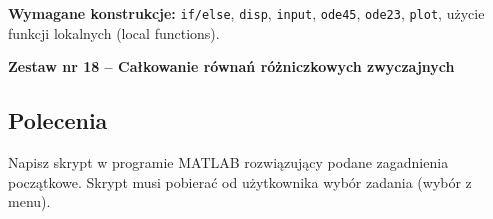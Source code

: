 \documentclass[a4paper,11pt]{article}
\begin{document}
\vspace{0.3cm}
\begin{ramka}
\textbf{Wymagane konstrukcje:}
\texttt{if/else}, \texttt{disp}, \texttt{input}, \texttt{ode45}, \texttt{ode23}, \texttt{plot}, użycie funkcji lokalnych (local functions).
\end{ramka}

\clearpage
\begin{center}
  {\large\bfseries Zestaw nr 18 \quad -- \quad Całkowanie równań różniczkowych zwyczajnych}
\end{center}
\hrulefill
\vspace{0.4cm}

\subsection*{Polecenia}

Napisz skrypt w programie MATLAB rozwiązujący podane zagadnienia początkowe. Skrypt musi pobierać od użytkownika wybór zadania (wybór z menu).
\end{document}

